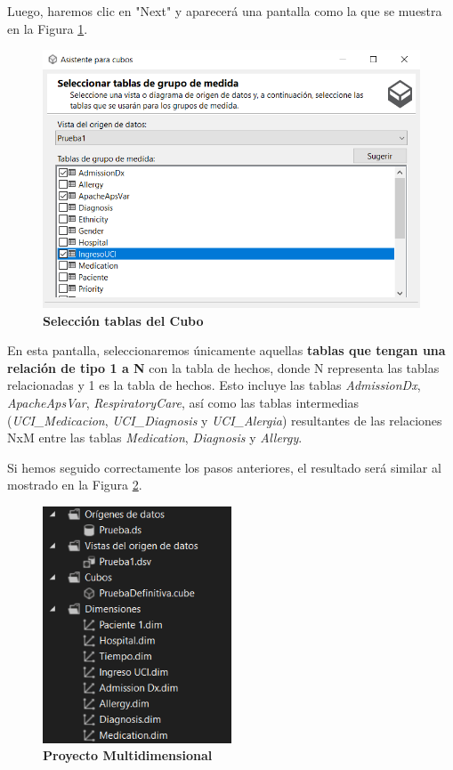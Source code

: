 \documentclass[12pt, a4paper, twoside]{article}
\begin{document}
Luego, haremos clic en "Next" y aparecerá una pantalla como la que se muestra en la Figura \ref{fig:10}.

\begin{figure}[H]
	\centering
	\includegraphics[width=1\textwidth]{image/seleccionTablasCubo}
	\caption{\textbf{Selección tablas del Cubo}}
	\label{fig:10}
\end{figure}

En esta pantalla, seleccionaremos únicamente aquellas \textbf{tablas que tengan una relación de tipo 1 a N} con la tabla de hechos, donde N representa las tablas relacionadas y 1 es la tabla de hechos. Esto incluye las tablas \textit{AdmissionDx}, \textit{ApacheApsVar}, \textit{RespiratoryCare}, así como las tablas intermedias (\textit{UCI\_Medicacion}, \textit{UCI\_Diagnosis} y \textit{UCI\_Alergia}) resultantes de las relaciones NxM entre las tablas \textit{Medication}, \textit{Diagnosis} y \textit{Allergy}.

Si hemos seguido correctamente los pasos anteriores, el resultado será similar al mostrado en la Figura \ref{fig:8}.

\begin{figure}[H]
	\centering
	\includegraphics[width=0.5\textwidth]{image/loquellevamos}
	\caption{\textbf{Proyecto Multidimensional}}
	\label{fig:8}
\end{figure}
\end{document}
